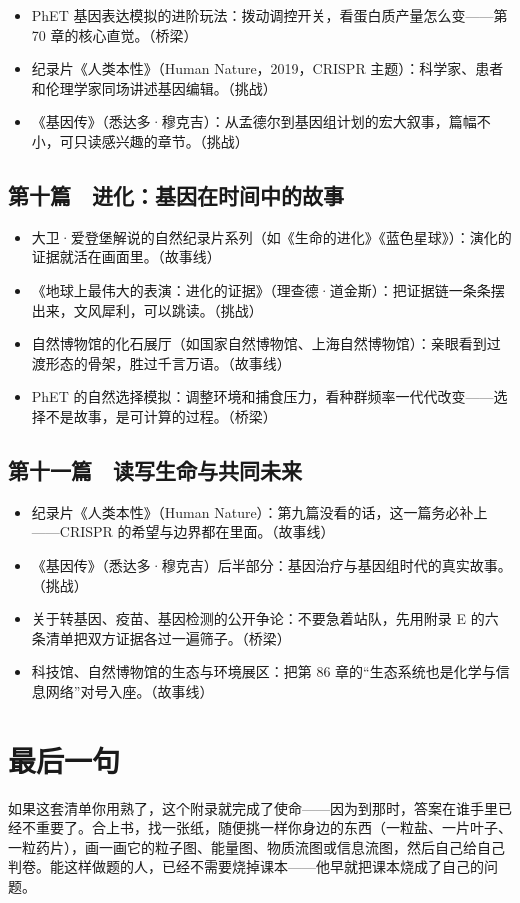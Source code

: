 \begin{itemize}[itemsep=2pt]
\item PhET 基因表达模拟的进阶玩法：拨动调控开关，看蛋白质产量怎么变——第 70 章的核心直觉。（桥梁）
\item 纪录片《人类本性》（Human Nature，2019，CRISPR 主题）：科学家、患者和伦理学家同场讲述基因编辑。（挑战）
\item 《基因传》（悉达多·穆克吉）：从孟德尔到基因组计划的宏大叙事，篇幅不小，可只读感兴趣的章节。（挑战）
\end{itemize}

\subsection*{第十篇　进化：基因在时间中的故事}

\begin{itemize}[itemsep=2pt]
\item 大卫·爱登堡解说的自然纪录片系列（如《生命的进化》《蓝色星球》）：演化的证据就活在画面里。（故事线）
\item 《地球上最伟大的表演：进化的证据》（理查德·道金斯）：把证据链一条条摆出来，文风犀利，可以跳读。（挑战）
\item 自然博物馆的化石展厅（如国家自然博物馆、上海自然博物馆）：亲眼看到过渡形态的骨架，胜过千言万语。（故事线）
\item PhET 的自然选择模拟：调整环境和捕食压力，看种群频率一代代改变——选择不是故事，是可计算的过程。（桥梁）
\end{itemize}

\subsection*{第十一篇　读写生命与共同未来}

\begin{itemize}[itemsep=2pt]
\item 纪录片《人类本性》（Human Nature）：第九篇没看的话，这一篇务必补上——CRISPR 的希望与边界都在里面。（故事线）
\item 《基因传》（悉达多·穆克吉）后半部分：基因治疗与基因组时代的真实故事。（挑战）
\item 关于转基因、疫苗、基因检测的公开争论：不要急着站队，先用附录 E 的六条清单把双方证据各过一遍筛子。（桥梁）
\item 科技馆、自然博物馆的生态与环境展区：把第 86 章的“生态系统也是化学与信息网络”对号入座。（故事线）
\end{itemize}

\section*{最后一句}

如果这套清单你用熟了，这个附录就完成了使命——因为到那时，答案在谁手里已经不重要了。合上书，找一张纸，随便挑一样你身边的东西（一粒盐、一片叶子、一粒药片），画一画它的粒子图、能量图、物质流图或信息流图，然后自己给自己判卷。能这样做题的人，已经不需要烧掉课本——他早就把课本烧成了自己的问题。
